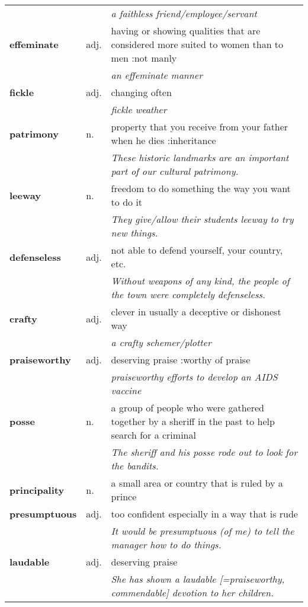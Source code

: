 \documentclass[a4paper]{article}
\begin{document}
\begin{longtable}{llp{11cm}}
 & & \textit{a faithless friend/employee/servant}\\[0.08cm]
\textbf{effeminate} & adj. &  having or showing qualities that are considered more suited to women than to men :not manly \\
 & & \textit{an effeminate manner}\\[0.08cm]
\textbf{fickle} & adj. &  changing often \\
 & & \textit{fickle weather}\\[0.08cm]
\textbf{patrimony} & n. &  property that you receive from your father when he dies :inheritance\\
 & & \textit{These historic landmarks are an important part of our cultural patrimony.}\\[0.08cm]
\textbf{leeway} & n. &  freedom to do something the way you want to do it \\
 & & \textit{They give/allow their students leeway to try new things.}\\[0.08cm]
\textbf{defenseless} & adj. &  not able to defend yourself, your country, etc. \\
 & & \textit{Without weapons of any kind, the people of the town were completely defenseless.}\\[0.08cm]
\textbf{crafty} & adj. &  clever in usually a deceptive or dishonest way \\
 & & \textit{a crafty schemer/plotter}\\[0.08cm]
\textbf{praiseworthy} & adj. &  deserving praise :worthy of praise \\
 & & \textit{praiseworthy efforts to develop an AIDS vaccine}\\[0.08cm]
\textbf{posse} & n. &  a group of people who were gathered together by a sheriff in the past to help search for a criminal \\
 & & \textit{The sheriff and his posse rode out to look for the bandits.}\\[0.08cm]
\textbf{principality} & n. &  a small area or country that is ruled by a prince\\[0.08cm]
\textbf{presumptuous} & adj. &  too confident especially in a way that is rude \\
 & & \textit{It would be presumptuous (of me) to tell the manager how to do things.}\\[0.08cm]
\textbf{laudable} & adj. &  deserving praise \\
 & & \textit{She has shown a laudable [=praiseworthy, commendable] devotion to her children.}\\[0.08cm]

\end{longtable}
\end{document}
